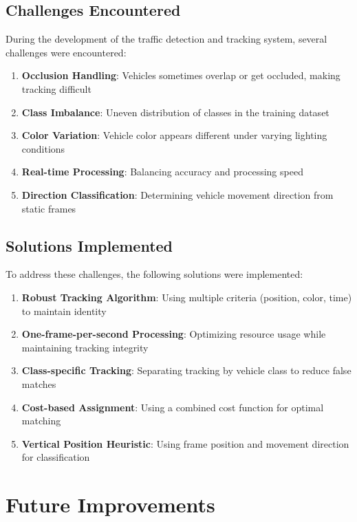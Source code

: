 \documentclass[9pt,a4paper,twoside]{rho-class/rho}
\begin{document}
    \subsection{Challenges Encountered}
    
    During the development of the traffic detection and tracking system, several challenges were encountered:
    
    \begin{enumerate}
        \item \textbf{Occlusion Handling}: Vehicles sometimes overlap or get occluded, making tracking difficult
        \item \textbf{Class Imbalance}: Uneven distribution of classes in the training dataset
        \item \textbf{Color Variation}: Vehicle color appears different under varying lighting conditions
        \item \textbf{Real-time Processing}: Balancing accuracy and processing speed
        \item \textbf{Direction Classification}: Determining vehicle movement direction from static frames
    \end{enumerate}
    
    \subsection{Solutions Implemented}
    
    To address these challenges, the following solutions were implemented:
    
    \begin{enumerate}
        \item \textbf{Robust Tracking Algorithm}: Using multiple criteria (position, color, time) to maintain identity
        \item \textbf{One-frame-per-second Processing}: Optimizing resource usage while maintaining tracking integrity
        \item \textbf{Class-specific Tracking}: Separating tracking by vehicle class to reduce false matches
        \item \textbf{Cost-based Assignment}: Using a combined cost function for optimal matching
        \item \textbf{Vertical Position Heuristic}: Using frame position and movement direction for classification
    \end{enumerate}

\section{Future Improvements}
\end{document}
